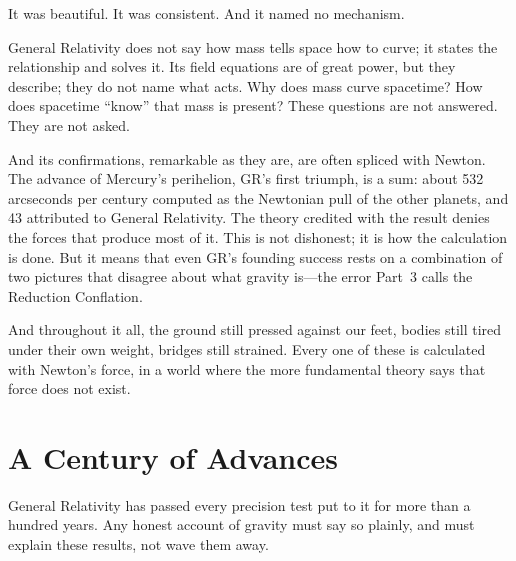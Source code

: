 \documentclass[11pt,a4paper]{article}
\begin{document}
It was beautiful. It was consistent. And it named no mechanism.

General Relativity does not say how mass tells space how to curve; it states the relationship and solves it. Its field equations are of great power, but they describe; they do not name what acts. Why does mass curve spacetime? How does spacetime ``know'' that mass is present? These questions are not answered. They are not asked.

And its confirmations, remarkable as they are, are often spliced with Newton. The advance of Mercury's perihelion, GR's first triumph, is a sum: about 532 arcseconds per century computed as the Newtonian pull of the other planets, and 43 attributed to General Relativity. The theory credited with the result denies the forces that produce most of it. This is not dishonest; it is how the calculation is done. But it means that even GR's founding success rests on a combination of two pictures that disagree about what gravity is---the error Part~3 calls the Reduction Conflation.

And throughout it all, the ground still pressed against our feet, bodies still tired under their own weight, bridges still strained. Every one of these is calculated with Newton's force, in a world where the more fundamental theory says that force does not exist.

\section{A Century of Advances}

General Relativity has passed every precision test put to it for more than a hundred years. Any honest account of gravity must say so plainly, and must explain these results, not wave them away.
\end{document}
